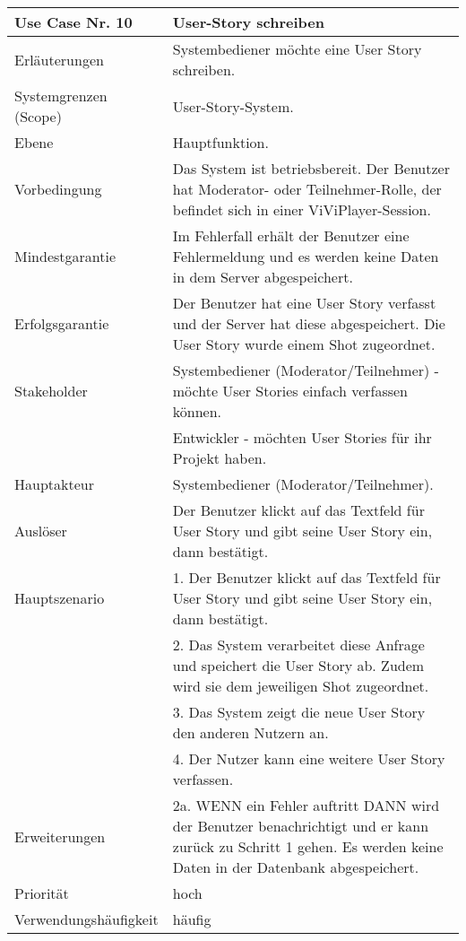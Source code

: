 \begin{tabularx}{\linewidth}{|l|X|}
	\hline
	Use Case Nr. 10			& \textbf{User-Story schreiben} \\ \hline
	Erläuterungen			& Systembediener möchte eine User Story schreiben. \\ \hline
	Systemgrenzen (Scope)	& User-Story-System. \\ \hline
	Ebene					& Hauptfunktion. \\ \hline
	Vorbedingung			& Das System ist betriebsbereit. Der Benutzer hat Moderator- oder 
							  Teilnehmer-Rolle, der befindet sich in einer ViViPlayer-Session. \\ \hline
	Mindestgarantie			& Im Fehlerfall erhält der Benutzer eine Fehlermeldung und es 
							  werden keine Daten in dem Server abgespeichert. \\ \hline
	Erfolgsgarantie			& Der Benutzer hat eine User Story verfasst und der Server hat
							  diese abgespeichert. Die User Story wurde einem Shot
							  zugeordnet. \\ \hline
	Stakeholder				& Systembediener (Moderator/Teilnehmer) - möchte User Stories 
							  einfach verfassen können.\\ 
                            & Entwickler - möchten User Stories für ihr Projekt haben. \\ 
                              \hline
	Hauptakteur				& Systembediener (Moderator/Teilnehmer). \\ \hline
	Auslöser				& Der Benutzer klickt auf das Textfeld für User Story und gibt 
							  seine User Story ein, dann bestätigt. \\ \hline	
	Hauptszenario			& 1. Der Benutzer klickt auf das Textfeld für User Story und gibt 
							  seine User Story ein, dann bestätigt. \\
							& 2. Das System verarbeitet diese Anfrage und speichert die User 
							  Story ab. Zudem wird sie dem jeweiligen Shot zugeordnet. \\
							& 3. Das System zeigt die neue User Story den anderen Nutzern an.\\
							& 4. Der Nutzer kann eine weitere User Story verfassen. \\ \hline
	Erweiterungen			& 2a. WENN ein Fehler auftritt DANN wird der Benutzer 
	                          benachrichtigt und er kann zurück zu Schritt 1 gehen. Es werden keine Daten in der Datenbank abgespeichert. \\ \hline
	Priorität				& hoch \\ \hline
	Verwendungshäufigkeit	& häufig \\ \hline
\end{tabularx}
